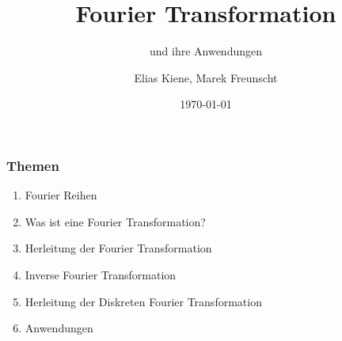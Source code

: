 \documentclass[aspectratio=169]{beamer}
\title{Fourier Transformation}
\subtitle{und ihre Anwendungen}
\author{Elias Kiene, Marek Freunscht}
\date{\today}
\begin{document}
\begin{frame}
    \titlepage
\end{frame}

\begin{frame}
    \frametitle{Themen}
    \begin{enumerate}
        \item Fourier Reihen
        \item Was ist eine Fourier Transformation?
        \item Herleitung der Fourier Transformation
        \item Inverse Fourier Transformation
        \item Herleitung der Diskreten Fourier Transformation
        \item Anwendungen
    \end{enumerate}
\end{frame}

    
    
    
    
\end{document}
